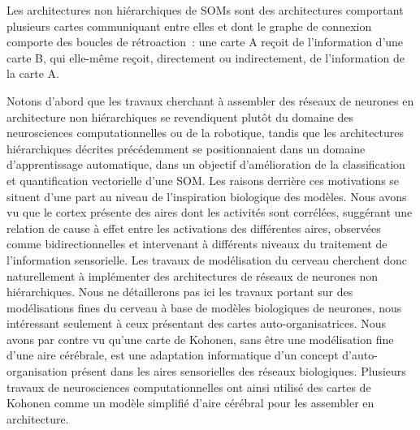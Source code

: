 \documentclass[../main]{subfiles}
\begin{document}
Les architectures non hiérarchiques de SOMs sont des architectures comportant plusieurs cartes communiquant entre elles et dont le graphe de connexion comporte des boucles de rétroaction~: une carte A reçoit de l'information d'une carte B, qui elle-même reçoit, directement ou indirectement, de l'information de la carte A.


Notons d'abord que les travaux cherchant à assembler des réseaux de neurones en architecture non hiérarchiques se revendiquent plutôt du domaine des neurosciences computationnelles ou de la robotique, tandis que les architectures hiérarchiques décrites précédemment se positionnaient dans un domaine d'apprentissage automatique, dans un objectif d'amélioration de la classification et quantification vectorielle d'une SOM.
Les raisons derrière ces motivations se situent d'une part au niveau de l'inspiration biologique des modèles. 
Nous avons vu que le cortex présente des aires dont les activités sont corrélées, suggérant une relation de cause à effet entre les activations des différentes aires, observées comme bidirectionnelles et intervenant à différents niveaux du traitement de l'information sensorielle.
Les travaux de modélisation du cerveau cherchent donc naturellement à implémenter des architectures de réseaux de neurones non hiérarchiques. 
Nous ne détaillerons pas ici les travaux portant sur des modélisations fines du cerveau à base de modèles biologiques de neurones, nous intéressant seulement à ceux présentant des cartes auto-organisatrices.
Nous avons par contre vu qu'une carte de Kohonen, sans être une modélisation fine d'une aire cérébrale, est une adaptation informatique d'un concept d'auto-organisation présent dans les aires sensorielles des réseaux biologiques. Plusieurs travaux de neurosciences computationnelles ont ainsi utilisé des cartes de Kohonen comme un modèle simplifié d'aire cérébral pour les assembler en architecture.
\end{document}
